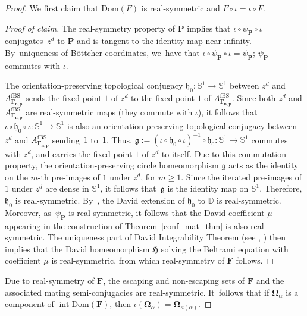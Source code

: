 \documentclass[JEP,XML,SOM,Unicode,NoFloatCountersInSection,published]{cedram}
\theoremstyle{definition}
\theoremstyle{remark}
\newcommand{\D}{\mathbb{D}}
\DeclareMathOperator{\Int}{int}
\begin{document}
\begin{proof}
We first claim that $\mathrm{Dom}(F)$ is real-symmetric and $F\circ \iota=\iota\circ F$.
\begin{proof}[Proof of claim]
The real-symmetry property of $\pmb{P}$ implies that $\iota\circ\psi_{\pmb{P}}\circ\iota$ conjugates~$z^{d}$ to $\pmb{P}$ and is tangent to the identity map near infinity. By~uniqueness of Böttcher coordinates, we~have that $\iota\circ\psi_{\pmb{P}}\circ\iota=\psi_{\pmb{P}}$; \ie $\psi_{\pmb{P}}$ commutes with $\iota$.

The orientation-preserving topological conjugacy $\mathfrak{h}_0:\mathbb{S}^1\to\mathbb{S}^1$ between $z^{d}$ and $A_{\pmb{\Gamma_{n,p}}}^{\mathrm{fBS}}$ sends the fixed point $1$ of $z^{d}$ to the fixed point $1$ of $A_{\pmb{\Gamma_{n,p}}}^{\mathrm{fBS}}$. Since both $z^d$ and $A_{\pmb{\Gamma_{n,p}}}^{\mathrm{fBS}}$ are real-symmetric maps (\ie they commute with $\iota$), it follows that $\iota\circ\mathfrak{h}_0\circ\iota:\mathbb{S}^1\to\mathbb{S}^1$ is also an orientation-preserving topological conjugacy between $z^d$ and $A_{\pmb{\Gamma_{n,p}}}^{\mathrm{fBS}}$ sending~$1$ to~$1$. Thus, $\mathfrak{g}:=(\iota\circ\mathfrak{h}_0\circ\iota)^{-1}\circ \mathfrak{h}_0:\mathbb{S}^1\to\mathbb{S}^1$ commutes with $z^{d}$, and carries the fixed point $1$ of $z^{d}$ to itself. Due to this commutation property, the orientation-preserving circle homeomorphism $\mathfrak{g}$ acts as the identity on the $m$-th pre-images of $1$ under $z^{d}$, for $m\geq 1$. Since the iterated pre-images of $1$ under $z^{d}$ are dense in $\mathbb{S}^1$, it follows that~$\mathfrak{g}$ is the identity map on $\mathbb{S}^1$. Therefore, $\mathfrak{h}_0$ is real-symmetric. By~\cite[Rem.\,2.4]{LMMN}, the David extension of $\mathfrak{h}_0$ to $\D$ is real-symmetric. Moreover, as~$\psi_{\pmb{P}}$ is real-symmetric, it follows that the David coefficient $\mu$ appearing in the construction of Theorem~\ref{conf_mat_thm} is also real-symmetric. The uniqueness part of David Integrability Theorem (see \cite{David}, \cite[Th.\,20.6.2, p.\,578]{AIM09}) then implies that the David homeomorphism $\mathfrak{H}$ solving the Beltrami equation with coefficient $\mu$ is real-symmetric, from which real-symmetry of $\pmb{F}$ follows.
\end{proof}

Due to real-symmetry of $\pmb{F}$, the escaping and non-escaping sets of $\pmb{F}$ and the associated mating semi-conjugacies are real-symmetric. It~follows that if $\pmb{\Omega}_\alpha$ is a component of $\Int{\mathrm{Dom}(\pmb{F})}$, then $\iota(\pmb{\Omega}_\alpha)=\pmb{\Omega}_{\kappa(\alpha)}$.


\end{proof}
\end{document}
